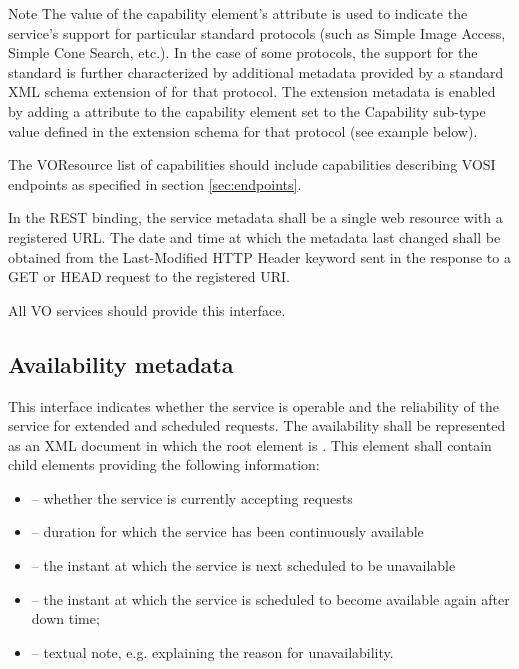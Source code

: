 \documentclass[11pt,letter]{ivoa}
\begin{document}
\begin{admonition}{Note}
The value of the capability element's  attribute is used to indicate the service's support for particular standard protocols (such as Simple Image Access, Simple Cone Search, etc.). In the case of some protocols, the support for the standard is further characterized by additional metadata provided by a standard XML schema extension of  for that protocol. The extension metadata is enabled by adding a  attribute to the capability element set to the Capability sub-type value defined in the extension schema for that protocol (see example below). 
    
The VOResource list of capabilities should include capabilities describing VOSI endpoints as specified in section \ref{sec:endpoints}.
\end{admonition}

In the REST binding, the service metadata shall be a single web resource with a registered URL. The date and time at which the metadata last changed shall be obtained from the Last-Modified HTTP Header keyword sent in the response to a GET or HEAD request to the registered URI.

All VO services should provide this interface. 

\subsection{Availability metadata}

This interface indicates whether the service is operable and the reliability of the service for extended and scheduled requests. The availability shall be represented as an XML document in which the root element is . This element shall contain child elements providing the following information:

\begin{itemize}
\item {} -- whether the service is currently accepting requests
\item {} -- duration for which the service has been continuously available
\item {} -- the instant at which the service is next scheduled to be unavailable
\item {} -- the instant at which the service is scheduled to become available again after down time;
\item {} -- textual note, e.g. explaining the reason for unavailability. 
\end{itemize}
\end{document}
